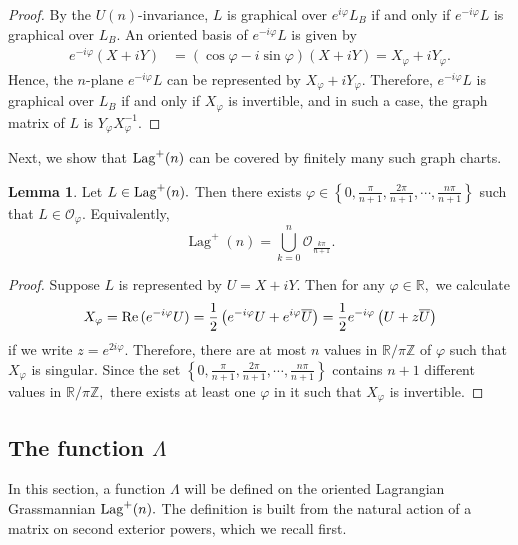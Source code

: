 \documentclass[11pt]{amsart}
\numberwithin{equation}{section}
\theoremstyle{definition}
\theoremstyle{definition}
\newtheorem{lemma}[equation]{Lemma}
\newcommand{\ovl}[1]{\overline{#1}}
\newcommand{\set}[1]{\left\{#1\right\}}
\newcommand{\pr}[1]{\left(#1\right)}
\newcommand{\bb}[1]{\mathbb{#1}} \newcommand{\td}[1]{\widetilde{#1}}
\begin{document}
\begin{proof}
	By the ${U}(n)$-invariance, $L$ is graphical over $e^{i\varphi}L_B$ if and only if $e^{-i\varphi}L$ is graphical over $L_B.$
	An oriented basis of $e^{-i\varphi}L$ is given by
	\begin{align*}
	e^{-i\varphi}(X+iY)
	& = \pr{\cos\varphi - i\sin\varphi}(X+iY) = X_\varphi
	+ iY_\varphi.
	\end{align*}
	Hence, the $n$-plane $e^{-i\varphi}L$ can be represented by 
	$X_\varphi+iY_\varphi.$
	Therefore, $e^{-i\varphi}L$ is graphical over $L_B$ if and only if $X_\varphi$ is invertible, and in such a case, the graph matrix of $L$ is $Y_\varphi X_\varphi^{-1}.$ 
\end{proof}


Next, we show that ${\rm Lag}^+(n)$ can be covered by finitely many such graph charts. 

\begin{lemma}
	\label{lem:graph-chart}
	Let $L\in {\rm Lag}^+(n).$
	Then there exists $\varphi\in\set{0,\frac{\pi}{n+1},\frac{2\pi}{n+1},\cdots,\frac{n\pi}{n+1}}$ such that $L\in\mathcal O_{\varphi}.$ Equivalently,
	\[
	\operatorname{Lag}^+(n)
	=
	\bigcup_{k=0}^{n}
	\mathcal O_{\frac{k\pi}{n+1}} .
	\]
\end{lemma}

\begin{proof}
	Suppose $L$ is represented by $U=X+iY$.
	Then for any $\varphi\in\bb R,$ we calculate
	\begin{align*}
	X_\varphi
	= {\rm Re }\, (e^{-i\varphi} U)
	= \frac 12 \pr{e^{-i\varphi} U + e^{i\varphi} \ovl U}
	= \frac 12 e^{-i\varphi} 
	\pr{U + z\ovl U}
	\end{align*}
	if we write $z=e^{2i\varphi}.$
	Therefore, there are at most $n$ values in $\bb R/\pi\bb Z$ of $\varphi$ such that $X_\varphi$ is singular. 
	Since the set $\set{0,\frac{\pi}{n+1},\frac{2\pi}{n+1},\cdots,\frac{n\pi}{n+1}}$ contains $n+1$ different values in $\bb R/\pi\bb Z,$ there exists at least one $\varphi$ in it such that $X_\varphi$ is invertible.
\end{proof}


\subsection{The function $\Lambda$}
\label{sec:Lambda}


In this section, a function $\Lambda$ will be defined on the oriented Lagrangian Grassmannian ${\rm Lag}^+(n).$ 
The definition is built from the natural action of a matrix on second exterior powers, which we recall first.
\end{document}

